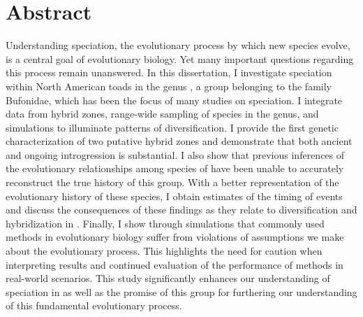\chapter*{Abstract}
Understanding speciation, the evolutionary process by which new species evolve, 
is a central goal of evolutionary biology.
Yet many important questions regarding this process remain unanswered. 
In this dissertation, I investigate speciation within North American toads in the genus \anaxyrus,
a group belonging to the family Bufonidae, which has been the focus of many 
studies on speciation.
I integrate data from hybrid zones, range-wide sampling of species in the genus, 
and simulations to illuminate patterns of diversification. 
I provide the first genetic characterization of two putative hybrid zones and 
demonstrate that both ancient and ongoing introgression is substantial.
I also show that previous inferences of the evolutionary relationships among 
species of \anaxyrus have been unable to accurately reconstruct the true history 
of this group.
With a better representation of the evolutionary history of these species, I 
obtain estimates of the timing of events and discuss the consequences of these 
findings as they relate to diversification and hybridization in \anaxyrus.
Finally, I show through simulations that commonly used methods in evolutionary 
biology suffer from violations of assumptions we make about the evolutionary process. 
This highlights the need for caution when interpreting results and continued 
evaluation of the performance of methods in real-world scenarios.
This study significantly enhances our understanding of speciation in \anaxyrus as 
well as the promise of this group for furthering our understanding 
of this fundamental evolutionary process.



